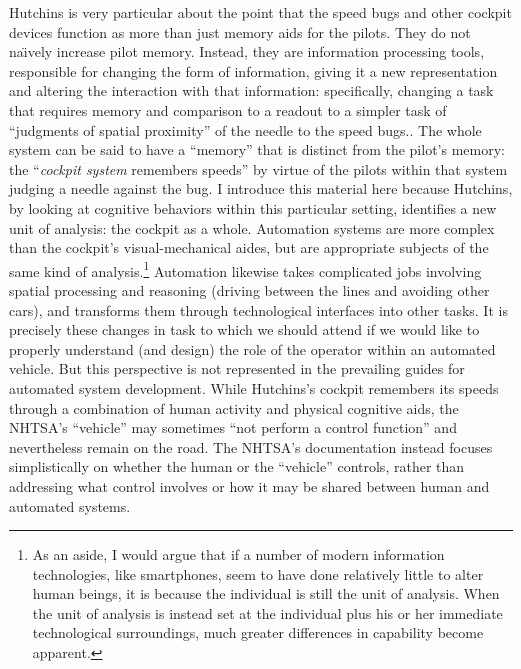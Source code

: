 Hutchins is very particular about the point that the speed bugs and
other cockpit devices function as more than just memory aids for the
pilots. They do not na\"{\i}vely increase pilot memory. Instead, they
are information processing tools, responsible for changing the form of
information, giving it a new representation and altering the
interaction with that information: specifically, changing a task that
requires memory and comparison to a readout to a simpler task of
``judgments of spatial proximity'' of the needle to the speed
bugs.\cite[p. 282]{hutchinsCockpit}. The whole system can be said to
have a ``memory'' that is distinct from the pilot's memory: the
``\emph{cockpit system} remembers speeds'' by virtue of the pilots
within that system judging a needle against the bug.\cite[p.
  283]{hutchinsCockpit} I introduce this material here because
Hutchins, by looking at cognitive behaviors within this particular
setting, identifies a new unit of analysis: the cockpit as a whole.
Automation systems are more complex than the cockpit's
visual-mechanical aides, but are appropriate subjects of the same kind
of analysis.\footnote{As an aside, I would argue that if a number of
  modern information technologies, like smartphones, seem to have done
relatively little to alter human beings, it is because the individual
is still the unit of analysis. When the unit of analysis is instead
set at the individual plus his or her immediate technological
surroundings, much greater differences in capability become apparent.}
Automation likewise takes complicated jobs involving spatial
processing and reasoning (driving between the lines and avoiding other
cars), and transforms them through technological interfaces into other
tasks. It is precisely these changes in task to which we should attend
if we would like to properly understand (and design) the role of the
operator within an automated vehicle. But this perspective is not
represented in the prevailing guides for automated system development.
While Hutchins's cockpit remembers its speeds through a combination of
human activity and physical cognitive aids, the NHTSA's ``vehicle''
may sometimes ``not perform a control function''\cite[p. 3]{NHTSA} and
nevertheless remain on the road. The NHTSA's documentation instead
focuses simplistically on whether the human or the ``vehicle''
controls, rather than addressing what control involves or how it may
be shared between human and automated systems.

